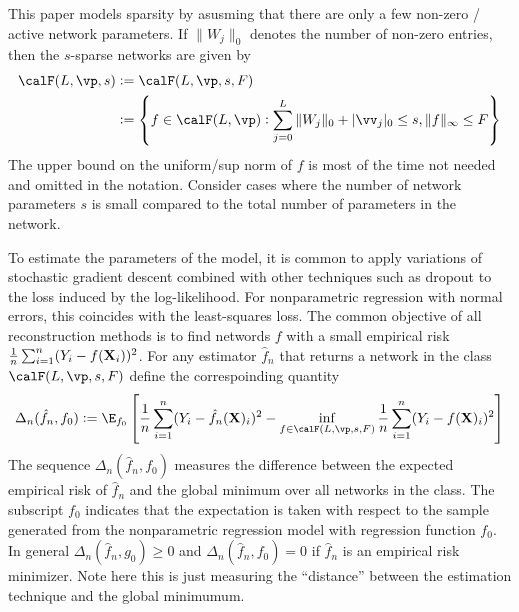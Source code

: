 This paper models sparsity by asusming that there are only a few non-zero / active network parameters. If \(\|W_j\|_0\) denotes the number of non-zero entries, then the $s$-sparse networks are given by 
\begin{equation}
\begin{split}
	\label{eq:sh-4}
	\calF(L, \vp, s) &:= \calF(L, \vp ,s, F) \\
	&:= \left\{f\in \calF(L, \vp): \sum_{j=0}^L \|W_j\|_0 + |\vv_j|_0 \leq s, \|f\|_\infty \leq F \right\}
\end{split}
\end{equation}
The upper bound on the uniform/sup norm of $f$ is most of the time not needed and omitted in the notation. Consider cases where the number of network parameters $s$ is small compared to the total number of parameters in the network. 

To estimate the parameters of the model, it is common to apply variations of stochastic gradient descent combined with other techniques such as dropout to the loss induced  by the log-likelihood. For nonparametric regression with normal errors, this coincides with the least-squares loss. The common objective of all reconstruction methods is to find networds $f$ with a small empirical risk $\frac{1}{n}\sum_{i=1}^n (Y_i - f(\mathbf{X}_i))^2$. For any estimator $\hat{f}_n$ that returns a network in the class $\calF(L,\vp, s, F)$ define the correspoinding quantity 
\begin{equation}
	\label{eq:sh-5}
	\Delta_n(\hat{f}_n, f_0) := \E_{f_0}\left[\frac{1}{n}\sum_{i=1}^n (Y_i - \hat{f}_n(\vX)_i)^2 - \inf_{f\in\calF(L,\vp, s, F)} \frac{1}{n} \sum_{i=1}^n (Y_i - f(\vX)_i)^2\right]
\end{equation}
The sequence $\Delta_n(\hat{f}_n , f_0)$ measures the difference between the expected empirical risk of $\hat{f}_n$ and the global minimum over all networks in the class. The subscript $f_0$ indicates that the expectation is taken with respect to the sample generated from the nonparametric regression model with regression function $f_0$. In general $\Delta_n (\hat{f}_n, g_0) \geq 0$ and $\Delta_n(\hat{f}_n, f_0) = 0$ if $\hat{f}_n$ is an empirical risk minimizer. Note here this is just measuring the ``distance'' between the estimation technique and the global minimumum. 

